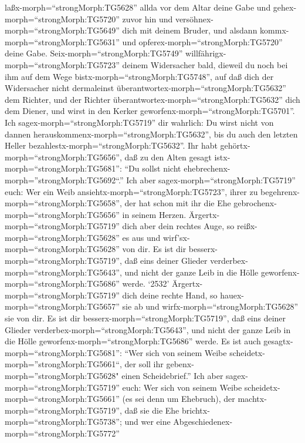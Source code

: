 laßx-morph=``strongMorph:TG5628'' allda vor dem Altar deine Gabe und
gehex-morph=``strongMorph:TG5720'' zuvor hin und
versöhnex-morph=``strongMorph:TG5649'' dich mit deinem Bruder, und
alsdann kommx-morph=``strongMorph:TG5631'' und
opferex-morph=``strongMorph:TG5720'' deine Gabe. 
Seix-morph=``strongMorph:TG5749''
willfährigx-morph=``strongMorph:TG5723'' deinem Widersacher bald,
dieweil du noch bei ihm auf dem Wege bistx-morph=``strongMorph:TG5748'',
auf daß dich der Widersacher nicht dermaleinst
überantwortex-morph=``strongMorph:TG5632'' dem Richter, und der Richter
überantwortex-morph=``strongMorph:TG5632'' dich dem Diener, und wirst in
den Kerker geworfenx-morph=``strongMorph:TG5701''.  Ich
sagex-morph=``strongMorph:TG5719'' dir wahrlich: Du wirst nicht von
dannen herauskommenx-morph=``strongMorph:TG5632'', bis du auch den
letzten Heller bezahlestx-morph=``strongMorph:TG5632''. 
Ihr habt gehörtx-morph=``strongMorph:TG5656'', daß zu den Alten gesagt
istx-morph=``strongMorph:TG5681'': ``Du sollst nicht
ehebrechenx-morph=''strongMorph:TG5692``.''  Ich aber
sagex-morph=``strongMorph:TG5719'' euch: Wer ein Weib
ansiehtx-morph=``strongMorph:TG5723'', ihrer zu
begehrenx-morph=``strongMorph:TG5658'', der hat schon mit ihr die Ehe
gebrochenx-morph=``strongMorph:TG5656'' in seinem Herzen. 
Ärgertx-morph=``strongMorph:TG5719'' dich aber dein rechtes Auge, so
reißx-morph=``strongMorph:TG5628'' es aus und
wirf'sx-morph=``strongMorph:TG5628'' von dir. Es ist dir
besserx-morph=``strongMorph:TG5719'', daß eins deiner Glieder
verderbex-morph=``strongMorph:TG5643'', und nicht der ganze Leib in die
Hölle geworfenx-morph=``strongMorph:TG5686'' werde.  `2532'
Ärgertx-morph=``strongMorph:TG5719'' dich deine rechte Hand, so
hauex-morph=``strongMorph:TG5657'' sie ab und
wirfx-morph=``strongMorph:TG5628'' sie von dir. Es ist dir
besserx-morph=``strongMorph:TG5719'', daß eins deiner Glieder
verderbex-morph=``strongMorph:TG5643'', und nicht der ganze Leib in die
Hölle geworfenx-morph=``strongMorph:TG5686'' werde.  Es ist
auch gesagtx-morph=``strongMorph:TG5681'': ``Wer sich von seinem Weibe
scheidetx-morph=''strongMorph:TG5661``, der soll ihr
gebenx-morph=''strongMorph:TG5628" einen Scheidebrief.'' 
Ich aber sagex-morph=``strongMorph:TG5719'' euch: Wer sich von seinem
Weibe scheidetx-morph=``strongMorph:TG5661'' (es sei denn um Ehebruch),
der machtx-morph=``strongMorph:TG5719'', daß sie die Ehe
brichtx-morph=``strongMorph:TG5738''; und wer eine
Abgeschiedenex-morph=``strongMorph:TG5772''
